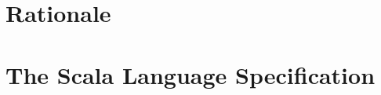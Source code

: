 \documentclass[a4paper,12pt,twoside,titlepage]{book}
\begin{document}
\frontmatter
\makedoctitle
\clearemptydoublepage
\tableofcontents
\mainmatter
\sloppy


\part{Rationale}



\part{The Scala Language Specification}







\end{document}
